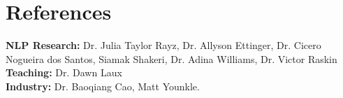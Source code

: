\documentclass[11pt]{article}
\begin{document}
\section*{References}
\textbf{NLP Research:} Dr. Julia Taylor Rayz, Dr. Allyson Ettinger, Dr. Cicero Nogueira dos Santos, Siamak Shakeri, Dr. Adina Williams, Dr. Victor Raskin\\
\textbf{Teaching:} Dr. Dawn Laux\\
\textbf{Industry:} Dr. Baoqiang Cao, Matt Younkle.



\end{document}
